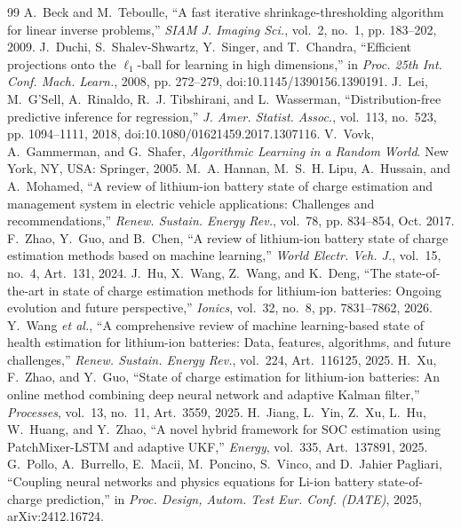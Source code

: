 \documentclass[journal]{IEEEtran}
\begin{document}
\begin{thebibliography}{99}
 A.~Beck and M.~Teboulle, ``A fast iterative shrinkage-thresholding algorithm for linear inverse problems,'' \emph{SIAM J. Imaging Sci.}, vol.~2, no.~1, pp. 183--202, 2009.
 J.~Duchi, S.~Shalev-Shwartz, Y.~Singer, and T.~Chandra, ``Efficient projections onto the $\ell_1$-ball for learning in high dimensions,'' in \emph{Proc. 25th Int. Conf. Mach. Learn.}, 2008, pp. 272--279, doi:10.1145/1390156.1390191.
 J.~Lei, M.~G'Sell, A.~Rinaldo, R.~J. Tibshirani, and L.~Wasserman, ``Distribution-free predictive inference for regression,'' \emph{J. Amer. Statist. Assoc.}, vol.~113, no.~523, pp. 1094--1111, 2018, doi:10.1080/01621459.2017.1307116.
 V.~Vovk, A.~Gammerman, and G.~Shafer, \emph{Algorithmic Learning in a Random World}. New York, NY, USA: Springer, 2005.
 M.~A. Hannan, M.~S.~H. Lipu, A.~Hussain, and A.~Mohamed, ``A review of lithium-ion battery state of charge estimation and management system in electric vehicle applications: Challenges and recommendations,'' \emph{Renew. Sustain. Energy Rev.}, vol.~78, pp. 834--854, Oct. 2017.
 F.~Zhao, Y.~Guo, and B.~Chen, ``A review of lithium-ion battery state of charge estimation methods based on machine learning,'' \emph{World Electr. Veh. J.}, vol.~15, no.~4, Art.~131, 2024.
 J.~Hu, X.~Wang, Z.~Wang, and K.~Deng, ``The state-of-the-art in state of charge estimation methods for lithium-ion batteries: Ongoing evolution and future perspective,'' \emph{Ionics}, vol.~32, no.~8, pp. 7831--7862, 2026.
 Y.~Wang \emph{et al.}, ``A comprehensive review of machine learning-based state of health estimation for lithium-ion batteries: Data, features, algorithms, and future challenges,'' \emph{Renew. Sustain. Energy Rev.}, vol.~224, Art.~116125, 2025.
 H.~Xu, F.~Zhao, and Y.~Guo, ``State of charge estimation for lithium-ion batteries: An online method combining deep neural network and adaptive Kalman filter,'' \emph{Processes}, vol.~13, no.~11, Art.~3559, 2025.
 H.~Jiang, L.~Yin, Z.~Xu, L.~Hu, W.~Huang, and Y.~Zhao, ``A novel hybrid framework for SOC estimation using PatchMixer-LSTM and adaptive UKF,'' \emph{Energy}, vol.~335, Art.~137891, 2025.
 G.~Pollo, A.~Burrello, E.~Macii, M.~Poncino, S.~Vinco, and D.~Jahier Pagliari, ``Coupling neural networks and physics equations for Li-ion battery state-of-charge prediction,'' in \emph{Proc. Design, Autom. Test Eur. Conf. (DATE)}, 2025, arXiv:2412.16724.

\end{thebibliography}
\end{document}
